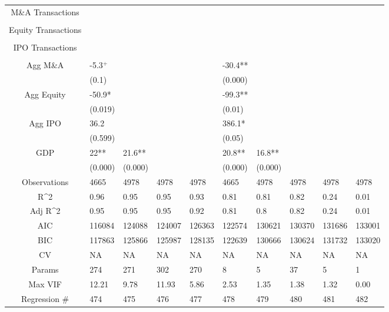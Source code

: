 \documentclass{article}
\begin{document}
\begin{table}[H]
\begin{tabular}{|clllllllll|}
  M\&A Transactions &  &  &  &  &  &  &  &  &  \\ 
   &  &  &  &  &  &  &  &  &  \\ 
  Equity Transactions &  &  &  &  &  &  &  &  &  \\ 
   &  &  &  &  &  &  &  &  &  \\ 
  IPO Transactions &  &  &  &  &  &  &  &  &  \\ 
   &  &  &  &  &  &  &  &  &  \\ 
  Agg M\&A & -5.3$^{+}$ &  &  &  & -30.4** &  &  &  &  \\ 
   & (0.1) &  &  &  & (0.000) &  &  &  &  \\ 
  Agg Equity & -50.9* &  &  &  & -99.3** &  &  &  &  \\ 
   & (0.019) &  &  &  & (0.01) &  &  &  &  \\ 
  Agg IPO & 36.2 &  &  &  & 386.1* &  &  &  &  \\ 
   & (0.599) &  &  &  & (0.05) &  &  &  &  \\ 
  GDP & 22** & 21.6** &  &  & 20.8** & 16.8** &  &  &  \\ 
   & (0.000) & (0.000) &  &  & (0.000) & (0.000) &  &  &  \\ 
  \hline 
 Observations & 4665 & 4978 & 4978 & 4978 & 4665 & 4978 & 4978 & 4978 & 4978 \\ 
  R^2 & 0.96 & 0.95 & 0.95 & 0.93 & 0.81 & 0.81 & 0.82 & 0.24 & 0.01 \\ 
  Adj R^2 & 0.95 & 0.95 & 0.95 & 0.92 & 0.81 & 0.8 & 0.82 & 0.24 & 0.01 \\ 
  AIC & 116084 & 124088 & 124007 & 126363 & 122574 & 130621 & 130370 & 131686 & 133001 \\ 
  BIC & 117863 & 125866 & 125987 & 128135 & 122639 & 130666 & 130624 & 131732 & 133020 \\ 
  CV & NA & NA & NA & NA & NA & NA & NA & NA & NA \\ 
  Params & 274 & 271 & 302 & 270 & 8 & 5 & 37 & 5 & 1 \\ 
  Max VIF & 12.21 & 9.78 & 11.93 & 5.86 & 2.53 & 1.35 & 1.38 & 1.32 & 0.00 \\ 
  Regression \# & 474 & 475 & 476 & 477 & 478 & 479 & 480 & 481 & 482 \\ 
   \hline
\end{tabular}
 
\end{table}
\end{document}
